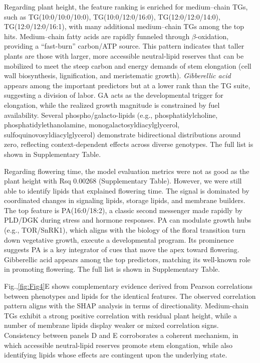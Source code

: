 \documentclass[10pt,letterpaper]{article}
\begin{document}
\begin{itemize}
Regarding plant height, the feature ranking is enriched for medium–chain TGs, such as TG(10{:}0/10{:}0/10{:}0), TG(10{:}0/12{:}0/16{:}0), TG(12{:}0/12{:}0/14{:}0), TG(12{:}0/12{:}0/16{:}1), with many additional medium–chain TGs among the top hits. Medium–chain fatty acids are rapidly funneled through $\beta$-oxidation, providing a ``fast-burn'' carbon/ATP source. This pattern indicates that taller plants are those with larger, more accessible neutral-lipid reserves that can be mobilized to meet the steep carbon and energy demands of stem elongation (cell wall biosynthesis, lignification, and meristematic growth). \textit{Gibberellic acid} appears among the important predictors but at a lower rank than the TG suite, suggesting a division of labor. GA acts as the developmental trigger for elongation, while the realized growth magnitude is constrained by fuel availability. Several phospho/galacto-lipids (e.g., phosphatidylcholine, phosphatidylethanolamine, monogalactosyldiacylglycerol, sulfoquinovosyldiacylglycerol) demonstrate bidirectional distributions around zero, reflecting context-dependent effects across diverse genotypes. The full list is shown in Supplementary Table.

Regarding flowering time, the model evaluation metrics were not as good as the plant height with Rsq 0.00268 (Supplementary Table). However, we were still able to identify lipids that explained flowering time. The signal is dominated by coordinated changes in signaling lipids, storage lipids, and membrane builders. The top feature is PA(16:0/18:2), a classic second messenger made rapidly by PLD/DGK during stress and hormone responses. PA can modulate growth hubs (e.g., TOR/SnRK1), which aligns with the biology of the floral transition turn down vegetative growth, execute a developmental program. Its prominence suggests PA is a key integrator of cues that move the apex toward flowering. Gibberellic acid appears among the top predictors, matching its well-known role in promoting flowering. The full list is shown in Supplementary Table. 

Fig.,\ref{fig:Fig4}E shows complementary evidence derived from Pearson correlations between phenotypes and lipids for the identical features. The observed correlation pattern aligns with the SHAP analysis in terms of directionality. Medium-chain TGs exhibit a strong positive correlation with residual plant height, while a number of membrane lipids display weaker or mixed correlation signs. Consistency between panels D and E corroborates a coherent mechanism, in which accessible neutral-lipid reserves promote stem elongation, while also identifying lipids whose effects are contingent upon the underlying state.


\end{itemize}
\end{document}

